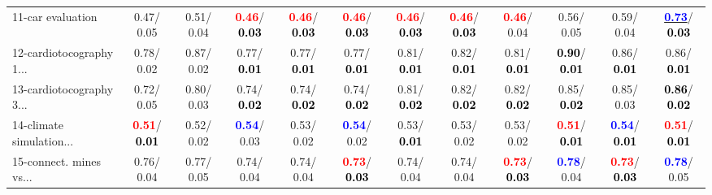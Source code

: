 \begin{table}[h]
\begin{center}
{\begin{tabular}{lc|c|c|c|c|c|c|c|c|c|c}
11-car evaluation &   0.47/  0.05 &   0.51/  0.04 & \textcolor{red}{\textbf{  0.46}}/\textcolor{black}{\textbf{  0.03}} & \textcolor{red}{\textbf{  0.46}}/\textcolor{black}{\textbf{  0.03}} & \textcolor{red}{\textbf{  0.46}}/\textcolor{black}{\textbf{  0.03}} & \textcolor{red}{\textbf{  0.46}}/\textcolor{black}{\textbf{  0.03}} & \textcolor{red}{\textbf{  0.46}}/\textcolor{black}{\textbf{  0.03}} & \textcolor{red}{\textbf{  0.46}}/  0.04 &   0.56/  0.05 &   0.59/  0.04 & \underline{\textcolor{blue}{\textbf{  0.73}}}/\textcolor{black}{\textbf{  0.03}} \\
12-cardiotocography 1... &   0.78/  0.02 &   0.87/  0.02 &   0.77/\textcolor{black}{\textbf{  0.01}} &   0.77/\textcolor{black}{\textbf{  0.01}} &   0.77/\textcolor{black}{\textbf{  0.01}} &   0.81/\textcolor{black}{\textbf{  0.01}} &   0.82/\textcolor{black}{\textbf{  0.01}} &   0.81/\textcolor{black}{\textbf{  0.01}} & \textcolor{black}{\textbf{  0.90}}/\textcolor{black}{\textbf{  0.01}} &   0.86/\textcolor{black}{\textbf{  0.01}} &   0.86/\textcolor{black}{\textbf{  0.01}} \\
13-cardiotocography 3... &   0.72/  0.05 &   0.80/  0.03 &   0.74/\textcolor{black}{\textbf{  0.02}} &   0.74/\textcolor{black}{\textbf{  0.02}} &   0.74/\textcolor{black}{\textbf{  0.02}} &   0.81/\textcolor{black}{\textbf{  0.02}} &   0.82/\textcolor{black}{\textbf{  0.02}} &   0.82/\textcolor{black}{\textbf{  0.02}} &   0.85/\textcolor{black}{\textbf{  0.02}} &   0.85/  0.03 & \textcolor{black}{\textbf{  0.86}}/\textcolor{black}{\textbf{  0.02}} \\
14-climate simulation... & \textcolor{red}{\textbf{  0.51}}/\textcolor{black}{\textbf{  0.01}} &   0.52/  0.02 & \textcolor{blue}{\textbf{  0.54}}/  0.03 &   0.53/  0.02 & \textcolor{blue}{\textbf{  0.54}}/  0.02 &   0.53/\textcolor{black}{\textbf{  0.01}} &   0.53/  0.02 &   0.53/  0.02 & \textcolor{red}{\textbf{  0.51}}/\textcolor{black}{\textbf{  0.01}} & \textcolor{blue}{\textbf{  0.54}}/\textcolor{black}{\textbf{  0.01}} & \textcolor{red}{\textbf{  0.51}}/\textcolor{black}{\textbf{  0.01}} \\ \hline
15-connect. mines vs... &   0.76/  0.04 &   0.77/  0.05 &   0.74/  0.04 &   0.74/  0.04 & \textcolor{red}{\textbf{  0.73}}/\textcolor{black}{\textbf{  0.03}} &   0.74/  0.04 &   0.74/  0.04 & \textcolor{red}{\textbf{  0.73}}/\textcolor{black}{\textbf{  0.03}} & \textcolor{blue}{\textbf{  0.78}}/  0.04 & \textcolor{red}{\textbf{  0.73}}/\textcolor{black}{\textbf{  0.03}} & \textcolor{blue}{\textbf{  0.78}}/  0.05 \\

\end{tabular}}
\end{center}
\end{table}
